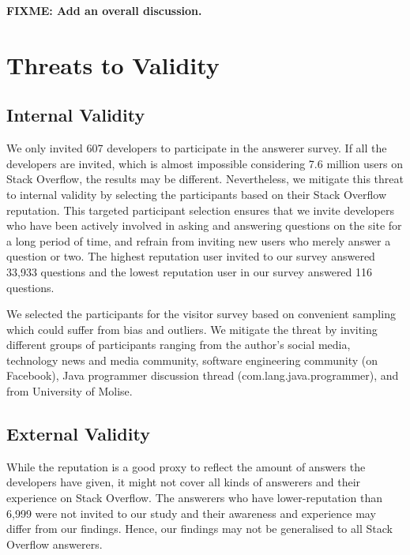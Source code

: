 \documentclass{svjour3}                     %
\newcommand\FIXME[1]{\textbf{FIXME: #1}}
\begin{document}
\vspace{0.5cm} \noindent{} \vspace{0.5cm}

\FIXME{Add an overall discussion.}

\section{Threats to Validity}

\subsection{Internal Validity}
We only invited 607
developers to participate in the answerer survey. If all the developers are
invited, which is almost impossible considering 7.6 million users on Stack
Overflow, the results may be different. Nevertheless, we mitigate this threat to
internal validity by selecting the participants based on their Stack Overflow
reputation. This targeted participant selection ensures that we
invite developers who have been actively involved in asking and answering
questions on the site for a long period of time, and refrain from inviting new
users who merely answer a question or two. The highest reputation user invited
to our survey answered 33,933 questions and the lowest reputation user in our
survey answered 116 questions.

We selected the participants for the visitor survey based on convenient sampling
which could suffer from bias and outliers. We mitigate the threat by inviting
different groups of participants ranging from the author's social media,
technology news and media community, software engineering community (on
Facebook), Java programmer discussion thread (com.lang.java.programmer), and
from University of Molise.


\subsection{External Validity} 
While the reputation is a good proxy to reflect the amount of answers the
developers have given, it might not cover all kinds of answerers and their
experience on Stack Overflow. The answerers who have lower-reputation than 6,999
were not invited to our study and their awareness and experience may differ from
our findings. Hence, our findings may not be generalised to all Stack Overflow
answerers.
\end{document}
